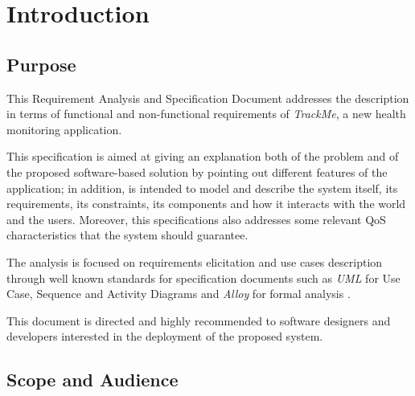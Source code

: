 \documentclass[a4paper]{article}
\begin{document}
\setlength{}{}

\tableofcontents
\newpage
{}
\renewcommand\listtablename{Use Cases Summary}
\listoftables
\newpage
{}
\renewcommand\listfigurename{UML Diagrams List}
\listoffigures
\newpage
{}
\newpage
\pagestyle{fancy}
\section{Introduction}

    \subsection{Purpose}
    This Requirement Analysis and Specification Document addresses the description in terms of functional and non-functional requirements of \textit{TrackMe}, a new health monitoring application.
    
    This specification is aimed at giving an explanation both of the problem and of the proposed software-based solution by pointing out different features of the application; in addition, is intended to model and describe the system itself, its requirements, its constraints, its components and how it interacts with the world and the users. Moreover, this specifications also addresses some relevant QoS characteristics that the system should guarantee.
    
    The analysis is focused on requirements elicitation and use cases description through well known standards for specification documents such as \textit{UML} for Use Case, Sequence and Activity Diagrams \cite{rumbaugh2004unified} and \textit{Alloy} for formal analysis \cite{jackson2006software}.
        
    This document is directed and highly recommended to software designers and developers interested in the deployment of the proposed system.
    
    \subsection{Scope and Audience}
\end{document}
